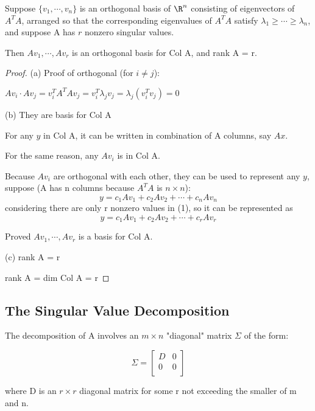 \begin{theorem}\label{theorem: 7.4.9}
    Suppose \(\{ v_1, \cdots, v_n \} \) is an orthogonal basis of \(\R^n\) consisting of eigenvectors of \(A^TA\), arranged so that the corresponding eigenvalues of \(A^TA\) satisfy \(\lambda_1 \geq \cdots \geq \lambda_n\), and suppose A has \(r\)  nonzero singular values.   

    Then \(Av_1, \cdots, Av_r\) is an orthogonal basis for Col A, and rank A = r.
\end{theorem}
\begin{proof}
    (a) Proof of orthogonal (for \(i \neq j\)):

    \(Av_i \cdot Av_j = v_i^T A^TA v_j = v_i^T \lambda_j v_j = \lambda_j (v_i^T v_j) = 0\) 

    (b) They are basis for Col A

    For any \(y\) in Col A, it can be written in combination of A columns, say \(Ax\). 

    For the same reason, any \(Av_i\) is in Col A. 

    Because \(Av_i\) are orthogonal with each other, they can be used to represent any \(y\), suppose (A has n columns because \(A^TA\) is \(n \times n\)):
    \[
        y = c_1 Av_1 + c_2 Av_2 + \cdots + c_n Av_n \tag{1}
    \]  
    considering there are only r nonzero values in (1), so it can be represented as
    \[
        y = c_1 Av_1 + c_2 Av_2 + \cdots + c_r Av_r \tag{2}
    \]

    Proved \(Av_1, \cdots, Av_r\) is a basis for Col A. 

    (c) rank A = r 

    rank A = dim Col A = r
\end{proof}

\subsection{The Singular Value Decomposition}

The decomposition of A involves an \(m \times n \)  "diagonal" matrix \(\Sigma\) of the form:

\[
    \Sigma = \begin{bmatrix}
        D &  0 \\
        0 &  0 \\
    \end{bmatrix} \tag{3}
\]

where D is an \(r \times r\) diagonal matrix for some r not exceeding the smaller of m and n.

